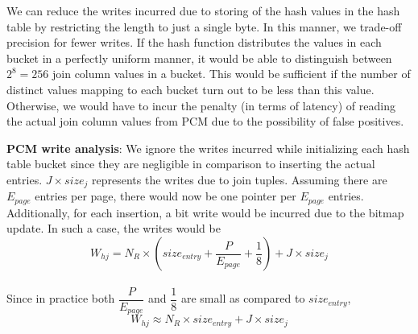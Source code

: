 We can reduce the writes incurred due to storing of the hash values in
the hash table by restricting the length to just a single byte. In this
manner, we trade-off precision for fewer writes. If the hash function
distributes the values in each bucket in a perfectly uniform manner, it
would be able to distinguish between $2^8 = 256$ join column values in a
bucket. This would be sufficient if the number of distinct values mapping
to each bucket turn out to be less than this value. Otherwise, we would
have to incur the penalty (in terms of latency) of reading the actual join
column values from PCM due to the possibility of false positives.

\textbf{PCM write analysis}: We ignore the writes incurred while initializing each hash table bucket since they are negligible in comparison to inserting the actual entries. $J \times size_j$ represents the writes due to join tuples. Assuming there are $E_{page}$ entries per page, there would now be one pointer per $E_{page}$ entries. Additionally, for each insertion, a bit write would be incurred due to the bitmap update. In such a case, the writes would be 
$$W_{hj} = N_R \times (size_{entry} +  \frac{P}{E_{page}} + \frac{1}{8} ) + J \times size_{j}$$\\
Since in practice both  $\dfrac{P}{E_{page}}$ and $\dfrac{1}{8}$ are small as compared to $size_{entry}$, 
\begin{equation}\label{eq:ht_bmp}
 W_{hj} \approx N_R \times size_{entry} + J \times size_{j} 
\end{equation} 
